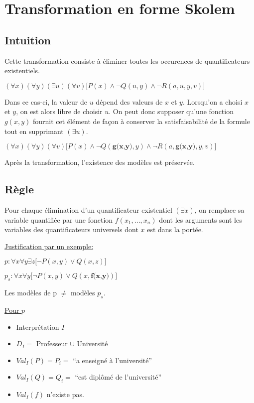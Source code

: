 \section{Transformation en forme Skolem}
\subsection{Intuition}

Cette transformation consiste à éliminer toutes les occurences de quantificateurs existentiels.
\smallskip

$(\forall x)(\forall y)(\exists u)(\forall v) \big[ P(x) \wedge \neg Q(u,y) \wedge \neg R(a,u,y,v) \big]$
\smallskip 


Dans ce cas-ci, la valeur de $u$ dépend des valeurs de $x$ et $y$. Lorsqu'on a choisi $x$ et $y$, on est alors libre de choisir $u$.
On peut donc supposer qu'une fonction $g(x,y)$ fournit cet élément de façon à conserver la satisfaisabilité de la formule tout en supprimant $(\exists u)$.
\smallskip

$(\forall x)(\forall y)(\forall v) \big[ P(x) \wedge \neg Q(\textbf{g(x,y)},y) \wedge \neg R(a,\textbf{g(x,y)},y,v) \big]$
\smallskip

Après la transformation, l'existence des modèles est préservée.

\subsection{Règle}

Pour chaque élimination d'un quantificateur existentiel $(\exists x)$, on remplace sa variable quantifiée par une fonction $f(x_1,...,x_n)$ dont les arguments sont les variables des quantificateurs universels dont $x$ est dans la portée.
\smallskip

\underline{Justification par un exemple:}

$p: \forall x \forall y \exists z \big[ \neg P(x,y) \vee Q(x,z) \big]$
\smallskip

$p_s: \forall x \forall y \big[ \neg P(x,y) \vee Q(x,\textbf{f(x,y)}) \big]$
\smallskip

Les modèles de p $\neq$ modèles $p_s$.

\underline{Pour $p$}
\begin{itemize}
  \item Interprétation $I$
  \item $D_I =$ Professeur $\cup$ Université
  \item $Val_I(P) = P_i = $ ``a enseigné à l'université''
  \item $Val_I(Q) = Q_i = $ ``est diplômé de l'université''
  \item $Val_I(f)$ n'existe pas.
\end{itemize}

